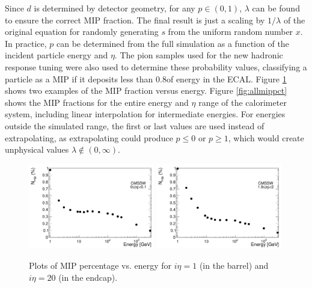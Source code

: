 Since $d$ is determined by detector geometry, for any $p \in (0,1)$, $\lambda$ can be found to ensure the correct MIP fraction. The final result is just a scaling by $1/\lambda$ of the original equation for randomly generating $s$ from the uniform random number $x$. In practice, $p$ can be determined from the full simulation as a function of the incident particle energy and $\eta$. The pion samples used for the new hadronic response tuning were also used to determine these probability values, classifying a particle as a MIP if it deposits less than 0.8\GeV of energy in the ECAL. Figure \ref{fig:mippct} shows two examples of the MIP fraction versus energy. Figure \ref{fig:allmippct} shows the MIP fractions for the entire energy and $\eta$ range of the calorimeter system, including linear interpolation for intermediate energies. For energies outside the simulated range, the first or last values are used instead of extrapolating, as extrapolating could produce $p \leq 0$ or $p \geq 1$, which would create unphysical values $\lambda \not\in (0,\infty)$.

\begin{figure}[hbtp]
\begin{center}
\includegraphics[width=0.49\textwidth]{figures/fs_plot_mip_ieta1.pdf}
\includegraphics[width=0.49\textwidth]{figures/fs_plot_mip_ieta20.pdf}
\caption{Plots of MIP percentage vs. energy for $i\eta = 1$ (in the barrel) and $i\eta = 20$ (in the endcap).}
\label{fig:mippct}
\end{center}
\end{figure}


